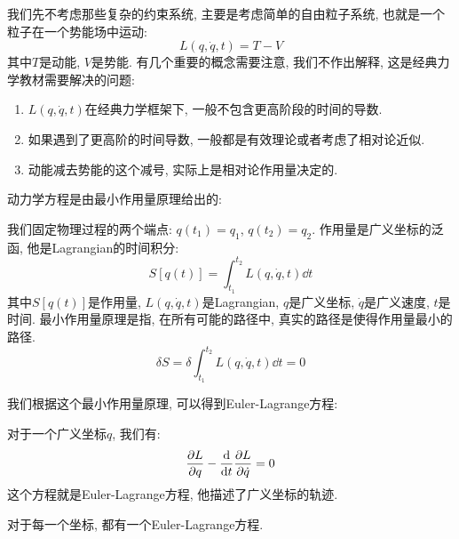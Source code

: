我们先不考虑那些复杂的约束系统, 主要是考虑简单的自由粒子系统, 也就是一个粒子在一个势能场中运动:
\begin{equation}
  L(q, \dot{q}, t) = T - V
\end{equation}
其中$T$是动能, $V$是势能.
有几个重要的概念需要注意, 我们不作出解释, 这是经典力学教材需要解决的问题:
\begin{enumerate}
\item $L(q, \dot{q}, t)$在经典力学框架下, 一般不包含更高阶段的时间的导数.
\item 如果遇到了更高阶的时间导数, 一般都是有效理论或者考虑了相对论近似.
\item 动能减去势能的这个减号, 实际上是相对论作用量决定的.
\end{enumerate}
动力学方程是由最小作用量原理给出的:
\begin{definition}[][最小作用量原理]
  我们固定物理过程的两个端点: $q(t_1)=q_1$, $q(t_2)=q_2$.
  作用量是广义坐标的泛函, 他是Lagrangian的时间积分:
  \begin{equation}
    S[q(t)] = \int_{t_1}^{t_2} L(q, \dot{q}, t) \dd{t}
  \end{equation}
  其中$S[q(t)]$是作用量, $L(q, \dot{q}, t)$是Lagrangian, $q$是广义坐标, $\dot{q}$是广义速度, $t$是时间.
  最小作用量原理是指, 在所有可能的路径中, 真实的路径是使得作用量最小的路径.
  \begin{equation}
    \delta S = \delta \int_{t_1}^{t_2} L(q, \dot{q}, t) \dd{t} = 0
  \end{equation}
\end{definition}
我们根据这个最小作用量原理, 可以得到Euler-Lagrange方程:
\begin{theorem}
  对于一个广义坐标$q$, 我们有:
  \begin{equation}
    \pdv{L}{q} - \frac{\dd}{\dd{t}} \pdv{L}{\dot{q}} = 0
  \end{equation}
  这个方程就是Euler-Lagrange方程, 他描述了广义坐标的轨迹.
\end{theorem}
对于每一个坐标, 都有一个Euler-Lagrange方程.


